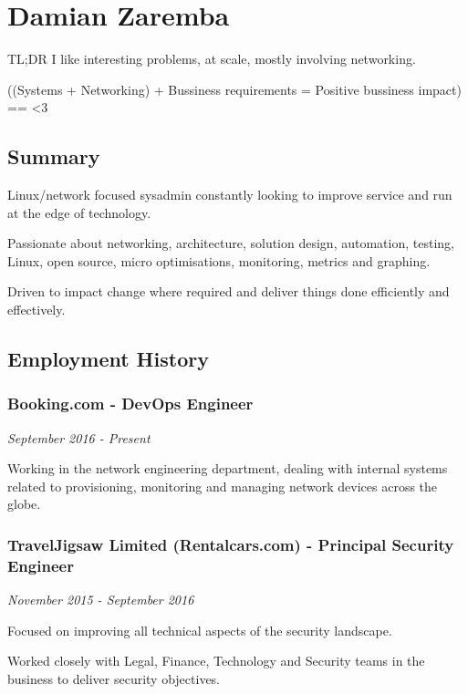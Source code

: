 \section{Damian Zaremba}\label{damian-zaremba}

TL;DR I like interesting problems, at scale, mostly involving
networking.

((Systems + Networking) + Bussiness requirements = Positive bussiness
impact) == \textless{}3

\subsection{Summary}\label{summary}

Linux/network focused sysadmin constantly looking to improve service and
run at the edge of technology.

Passionate about networking, architecture, solution design, automation,
testing, Linux, open source, micro optimisations, monitoring, metrics
and graphing.

Driven to impact change where required and deliver things done
efficiently and effectively.

\subsection{Employment History}\label{employment-history}

\subsubsection{Booking.com - DevOps
Engineer}\label{booking.com---devops-engineer}

\emph{September 2016 - Present}

Working in the network engineering department, dealing with internal
systems related to provisioning, monitoring and managing network devices
across the globe.

\subsubsection{TravelJigsaw Limited (Rentalcars.com) - Principal
Security
Engineer}\label{traveljigsaw-limited-rentalcars.com---principal-security-engineer}

\emph{November 2015 - September 2016}

Focused on improving all technical aspects of the security landscape.

Worked closely with Legal, Finance, Technology and Security teams in the
business to deliver security objectives.

